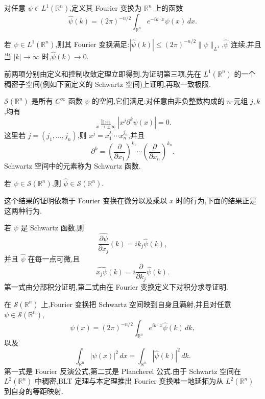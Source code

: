 \begin{definition}[Fourier 变换]\label{app:def:fourier}
对任意 \(\psi\in L^1(\mathbb R^n)\),定义其 Fourier 变换为 \(\mathbb R^n\) 上的函数
\[
\widehat\psi(k)=(2\pi)^{-n/2}\int_{\mathbb R^n}e^{-ik\cdot x}\psi(x)\,dx.
\]
\end{definition}

\begin{proposition}\label{app:prop:fourier-basic}
若 \(\psi\in L^1(\mathbb R^n)\),则其 Fourier 变换满足:\(|\widehat\psi(k)|\le(2\pi)^{-n/2}\|\psi\|_{L^1}\),\(\widehat\psi\) 连续,并且当 \(|k|\to\infty\) 时,\(\widehat\psi(k)\to0\).
\end{proposition}

前两项分别由定义和控制收敛定理立即得到.为证明第三项,先在 \(L^1(\mathbb R^n)\) 的一个稠密子空间(例如下面定义的 Schwartz 空间)上证明,再取一致极限.

\begin{definition}[Schwartz 空间]\label{app:def:schwartz}
\(\mathcal S(\mathbb R^n)\) 是所有 \(C^\infty\) 函数 \(\psi\) 的空间,它们满足:对任意由非负整数构成的 \(n\)-元组 \(j,k\),均有
\[
\lim_{x\to\pm\infty}|x^j\partial^k\psi(x)|=0.
\]
这里若 \(j=(j_1,\ldots,j_n)\),则 \(x^j=x_1^{j_1}\cdots x_n^{j_n}\),并且
\[
\partial^k=\left(\frac{\partial}{\partial x_1}\right)^{k_1}\cdots\left(\frac{\partial}{\partial x_n}\right)^{k_n}.
\]
Schwartz 空间中的元素称为 Schwartz 函数.
\end{definition}

\begin{proposition}\label{app:prop:fourier-schwartz}
若 \(\psi\in\mathcal S(\mathbb R^n)\),则 \(\widehat\psi\in\mathcal S(\mathbb R^n)\).
\end{proposition}

这个结果的证明依赖于 Fourier 变换在微分以及乘以 \(x\) 时的行为,下面的结果正是这两种行为.

\begin{proposition}\label{app:prop:fourier-derivatives}
若 \(\psi\) 是 Schwartz 函数,则
\[
\widehat{\frac{\partial\psi}{\partial x_j}}(k)=ik_j\widehat\psi(k),\tag{A.1}
\]
并且 \(\widehat\psi\) 在每一点可微,且
\[
\widehat{x_j\psi}(k)=i\frac{\partial}{\partial k_j}\widehat\psi(k).\tag{A.2}
\]
第一式由分部积分证明,第二式由在 Fourier 变换定义下对积分求导证明.
\end{proposition}

\begin{theorem}\label{app:thm:plancherel-I}
在 \(\mathcal S(\mathbb R^n)\) 上,Fourier 变换把 Schwartz 空间映到自身且满射,并且对任意 \(\psi\in\mathcal S(\mathbb R^n)\),
\[
\psi(x)=(2\pi)^{-n/2}\int_{\mathbb R^n}e^{ik\cdot x}\widehat\psi(k)\,dk,
\]
以及
\[
\int_{\mathbb R^n}|\psi(x)|^2\,dx=\int_{\mathbb R^n}|\widehat\psi(k)|^2\,dk.
\]
第一式是 Fourier 反演公式,第二式是 Plancherel 公式.由于 Schwartz 空间在 \(L^2(\mathbb R^n)\) 中稠密,BLT 定理与本定理推出 Fourier 变换唯一地延拓为从 \(L^2(\mathbb R^n)\) 到自身的等距映射.
\end{theorem}

